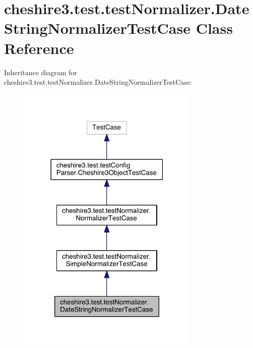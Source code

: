 \hypertarget{classcheshire3_1_1test_1_1test_normalizer_1_1_date_string_normalizer_test_case}{\section{cheshire3.\-test.\-test\-Normalizer.\-Date\-String\-Normalizer\-Test\-Case Class Reference}
\label{classcheshire3_1_1test_1_1test_normalizer_1_1_date_string_normalizer_test_case}
}


Inheritance diagram for cheshire3.\-test.\-test\-Normalizer.\-Date\-String\-Normalizer\-Test\-Case\-:
\nopagebreak
\begin{figure}[H]
\begin{center}
\leavevmode
\includegraphics[width=246pt]{classcheshire3_1_1test_1_1test_normalizer_1_1_date_string_normalizer_test_case__inherit__graph}
\end{center}
\end{figure}


